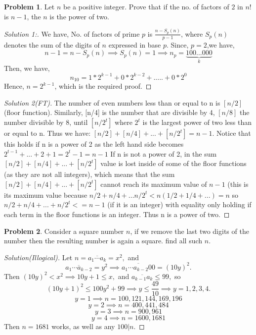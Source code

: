 \documentclass[a4paper,oneside,12 pt]{book}
\theoremstyle{definition}
\theoremstyle{definition}
\newtheorem{prbm}{Problem}[section]
\theoremstyle{definition}
\begin{document}
\begin{prbm}
Let $n$ be a positive integer. Prove that if the no. of factors of $2$ in $n!$ is $n-1$, the $n$ is the power of two.

\begin{proof} [Solution 1:]
We have, No. of factors of prime $p$ is $\frac{n-S_p(n)}{p-1}$, where $S_p(n)$ denotes the sum of the digits of $n$ expressed in base $p$.
Since, $p=2$,we have,
$$n-1=n-S_p(n)\implies S_p(n)=1 \implies n_p=\underbrace{100...000}_k$$Then, we have,
$$n_{10}=1*2^{k-1}+0*2^{k-2}+.....+0*2^0$$Hence, $\boxed{n=2^{k-1}}$, which is the required proof.
\end{proof}
\begin{proof}[Solution 2(FT)]
The number of even numbers less than or equal to n is $[n/2]$ (floor function).
Similarly, [n/4] is the number that are divisible by 4, $[n/8]$ the number divisible by 8, until $[n/{2^t}]$ where $2^t$ is the largest power of two less than or equal to n.
Thus we have:
$[n/2]+[n/4]+...+[n/{2^t}]=n-1$.
Notice that this holds if n is a power of 2 as the left hand side becomes $2^{t-1}+...+2+1=2^t-1=n-1$
If n is not a power of 2, in the sum $[n/2]+[n/4]+...+[n/{2^t}]$ value is lost inside of some of the floor functions (as they are not all integers), which means that the sum $[n/2]+[n/4]+...+[n/{2^t}]$ cannot reach its maximum value of $n-1$ (this is its maximum value because $n/2+n/4+...n/{2^t}<n(1/2+1/4+...)=n$ so $n/2+n/4+...+n/{2^t}<=n-1$ (if it is an integer) with equality only holding if each term in the floor functions is an integer.
Thus n is a power of two.
\end{proof}
\end{prbm}

\begin{prbm}
Consider a square number $n$, if we remove the last two digits of the number then the resulting number is again a square. find all such $n$.
\begin{proof}[Solution(Illogical)]
Let $n=\overline{a_1\cdots a_k}=x^2,$ and $$\overline{a_1\cdots a_{k-2}}=y^2\implies \overline{a_1\cdots a_{k-2}00}=(10y)^2.$$ Then $(10y)^2<x^2\implies 10y+1\le x,$ and $\overline{a_{k-1}a_k}\le 99,$ so 
$$(10y+1)^2\le100y^2+99\implies y\le \frac{49}{10}\implies y=1,2,3,4.$$
$$y=1 \implies n=100,121,144,169,196$$
$$y=2 \implies n=400,441,484$$
$$y=3 \implies n=900,961$$
$$y=4 \implies n=1600,1681$$
Then $n=1681$ works, as well as any $100|n.$

\end{proof}

\end{prbm}
\end{document}
